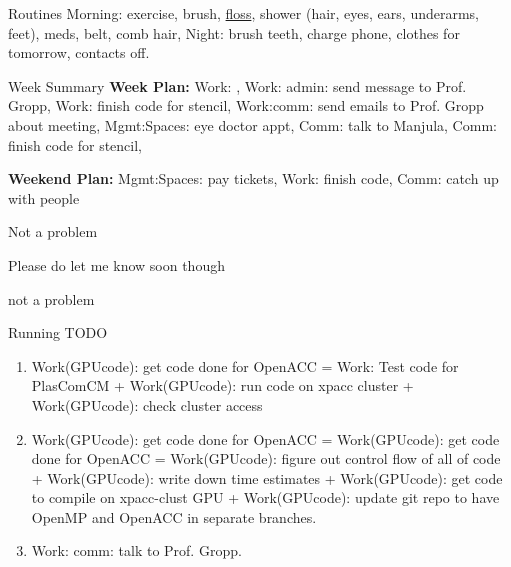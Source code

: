 \begin{frame}
\begin{columns}
    \begin{column}{0.50\linewidth}

      \begin{block}{Routines}
        Morning: exercise, brush, \underline{floss}, shower (hair, eyes, ears,
        underarms, feet), meds, belt, comb hair, Night: brush teeth, charge
        phone, clothes for tomorrow, contacts off.  
      \end{block}

      \begin{block}{Week Summary}
        {\tiny \textbf{Week Plan:}  Work:   , Work: admin: send message to Prof. Gropp, Work: finish code for stencil, Work:comm: send emails to Prof. Gropp
          about meeting, Mgmt:Spaces: eye doctor appt, Comm: talk to
          Manjula, Comm: finish code for stencil, 
        } 

        {\tiny \textbf{Weekend Plan:} Mgmt:Spaces: pay tickets, Work: finish code, Comm: catch up with people} 

      \end{block} 


Not a problem 

Please do let me know soon though

not a problem 




      \begin{block}{Running TODO} %
        \begin{enumerate}

     \item \tiny Work(GPUcode): get code done for OpenACC = 
       Work: Test code for PlasComCM + 
       Work(GPUcode): run code on xpacc cluster + 
       Work(GPUcode): check cluster access 

     \item \tiny Work(GPUcode): get code done for OpenACC =
       Work(GPUcode): get code done for OpenACC = Work(GPUcode):
       figure out control flow of all of code + Work(GPUcode): write
       down time estimates + Work(GPUcode): get code to compile on
       xpacc-clust GPU + Work(GPUcode): update git repo to have OpenMP
       and OpenACC in separate branches. 

     \item \tiny Work: comm: talk to Prof. Gropp. 


\end{enumerate}
\end{block}
\end{column}
\end{columns}
\end{frame}
